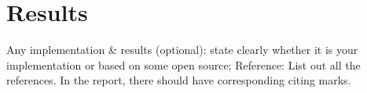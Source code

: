 \section{Results}
\label{sec:results}

Any implementation \& results (optional): state clearly whether it is your
implementation or based on some open source;
Reference: List out all the references. In the report, there should have
corresponding citing marks.

